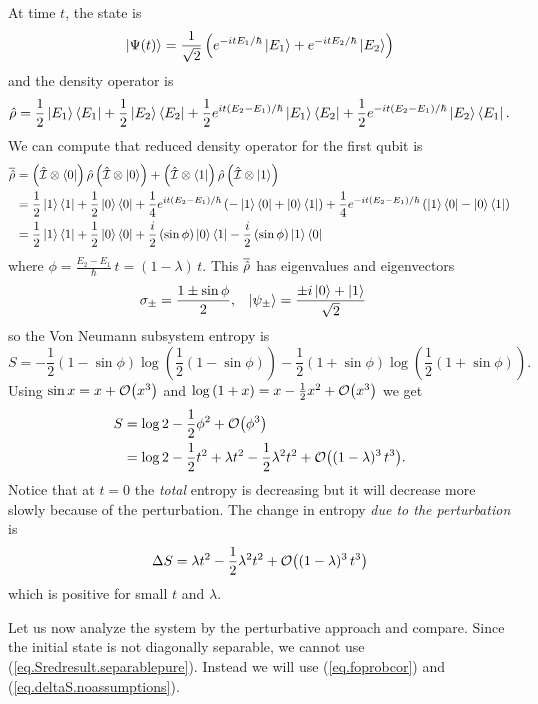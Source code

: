At time \(t\), the state is
\[
\left|\Psi(t)\right\rangle = \frac{1}{\sqrt{2}}\left(e^{-itE_1/\hbar}\left|E_1\right\rangle + e^{-itE_2/\hbar} \left|E_2\right\rangle\right)
\]
and the density operator is
\[
\hat{\rho} = \frac{1}{2}\left|E_1\right\rangle\left\langle E_1\right| + \frac{1}{2}\left|E_2\right\rangle\left\langle E_2\right| + \frac{1}{2} e^{it\left(E_2-E_1\right)/\hbar} \left|E_1\right\rangle\left\langle E_2\right| + \frac{1}{2} e^{-it\left(E_2 - E_1\right)/\hbar} \left|E_2\right\rangle\left\langle E_1\right|.
\]
We can compute that reduced density operator for the first qubit is
\begin{align*}
\overline{\hat{\rho}} &= \left(\hat{\mathcal{I}}\otimes\left\langle0\right|\right) \hat{\rho} \left(\hat{\mathcal{I}}\otimes\left|0\right\rangle\right) + \left(\hat{\mathcal{I}}\otimes\left\langle1\right|\right) \hat{\rho} \left(\hat{\mathcal{I}}\otimes\left|1\right\rangle\right) \\
&= \frac{1}{2} \left|1\right\rangle\left\langle1\right| + \frac{1}{2}\left|0\right\rangle\left\langle0\right| + \frac{1}{4} e^{it\left(E_2-E_1\right)/\hbar}\left(-\left|1\right\rangle\left\langle0\right| + \left|0\right\rangle\left\langle1\right|\right) + \frac{1}{4} e^{-it\left(E_2-E_1\right)/\hbar}\left(\left|1\right\rangle\left\langle0\right| - \left|0\right\rangle\left\langle1\right|\right) \\
&= \frac{1}{2}\left|1\right\rangle\left\langle1\right| + \frac{1}{2}\left|0\right\rangle\left\langle0\right| + \frac{i}{2} \left(\sin \phi\right) \left|0\right\rangle\left\langle1\right| - \frac{i}{2} \left(\sin \phi\right) \left|1\right\rangle\left\langle0\right|
\end{align*}
where \(\phi = \frac{E_2-E_1}{\hbar}\,t = (1-\lambda)\,t\).
This \(\overline{\hat{\rho}}\) has eigenvalues and eigenvectors
\begin{align*}
\sigma_{\pm} &= \frac{1 \pm \sin \phi}{2}, &
\left|\psi_\pm\right\rangle &= \frac{\pm i \left|0\right\rangle + \left|1\right\rangle}{\sqrt{2}}
\end{align*}
so the Von Neumann subsystem entropy is
\[
S = - \frac{1}{2}\left(1-\sin\phi\right) \log \left(\frac{1}{2}\left(1-\sin\phi\right)\right) - \frac{1}{2}\left(1+\sin\phi\right) \log \left(\frac{1}{2}\left(1+\sin\phi\right)\right).
\]
Using \(\sin x = x + \mathcal{O}{\left(x^3\right)}\) and \(\log\left(1+x\right) = x - \frac{1}{2} x^2 + \mathcal{O}{\left(x^3\right)}\) we get
\begin{align*}
S &= \log 2 - \frac{1}{2}\phi^2 + \mathcal{O}{\left(\phi^3\right)} \\
&= \log 2 - \frac{1}{2}t^2 + \lambda t^2 - \frac{1}{2}\lambda^2 t^2 + \mathcal{O}{\left((1-\lambda)^3\,t^3\right)}.
\end{align*}
Notice that at \(t=0\) the \emph{total} entropy is decreasing but it will decrease more slowly because of the perturbation. The change in entropy \emph{due to the perturbation} is
\[
\Delta S = \lambda t^2 - \frac{1}{2} \lambda^2 t^2 + \mathcal{O}{\left((1-\lambda)^3\,t^3\right)}
\]
which is positive for small \(t\) and \(\lambda\). 

Let us now analyze the system by the perturbative approach and compare. Since the initial state is not diagonally separable, we cannot use (\ref{eq.Sredresult.separablepure}). Instead we will use (\ref{eq.foprobcor}) and (\ref{eq.deltaS.noassumptions}).

